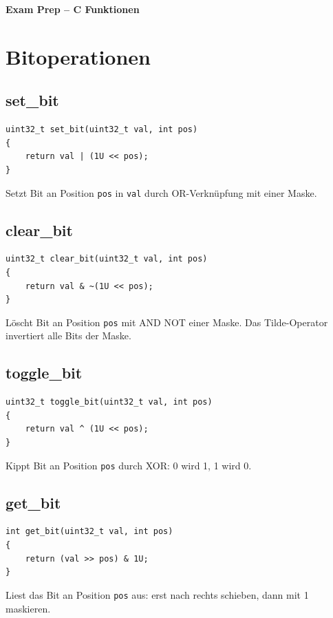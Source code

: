 \documentclass[10pt, a4paper]{article}
\begin{document}
\begin{center}
    {\large\bfseries Exam Prep -- C Funktionen}
\end{center}

\tableofcontents
\newpage

\section{Bitoperationen}

\subsection{set\_bit}
\begin{lstlisting}
uint32_t set_bit(uint32_t val, int pos)
{
    return val | (1U << pos);
}
\end{lstlisting}
Setzt Bit an Position \texttt{pos} in \texttt{val} durch OR-Verkn\"upfung mit einer Maske.

\subsection{clear\_bit}
\begin{lstlisting}
uint32_t clear_bit(uint32_t val, int pos)
{
    return val & ~(1U << pos);
}
\end{lstlisting}
L\"oscht Bit an Position \texttt{pos} mit AND NOT einer Maske. Das Tilde-Operator invertiert alle Bits der Maske.

\subsection{toggle\_bit}
\begin{lstlisting}
uint32_t toggle_bit(uint32_t val, int pos)
{
    return val ^ (1U << pos);
}
\end{lstlisting}
Kippt Bit an Position \texttt{pos} durch XOR: 0 wird 1, 1 wird 0.

\subsection{get\_bit}
\begin{lstlisting}
int get_bit(uint32_t val, int pos)
{
    return (val >> pos) & 1U;
}
\end{lstlisting}
Liest das Bit an Position \texttt{pos} aus: erst nach rechts schieben, dann mit 1 maskieren.
\end{document}
